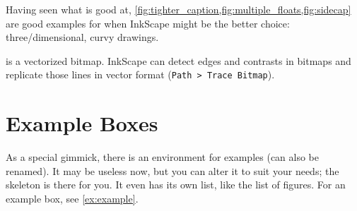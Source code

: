 Having seen what  is good at,
\cref{fig:tighter_caption,fig:multiple_floats,fig:sidecap}
are good examples for when InkScape might be the better choice:
three\-/dimensional, curvy drawings.

 is a vectorized bitmap.
InkScape can detect edges and contrasts in bitmaps and replicate those lines in
vector format (\texttt{Path > Trace Bitmap}).

\section{Example Boxes}

As a special gimmick, there is an environment for examples (can also be renamed).
It may be useless now, but you can alter it to suit your needs; the skeleton is
there for you.
It even has its own list, like the list of figures.
For an example box, see \cref{ex:example}.

